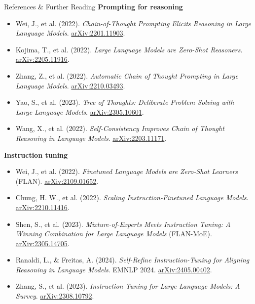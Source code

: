 \begin{frame}[allowframebreaks]{References \& Further Reading}
  \small
  \textbf{Prompting for reasoning}
  \begin{itemize}\itemsep0.3em
    \item Wei, J., et al. (2022). \emph{Chain-of-Thought Prompting Elicits Reasoning in Large Language Models}. \href{https://arxiv.org/abs/2201.11903}{arXiv:2201.11903}.
    \item Kojima, T., et al. (2022). \emph{Large Language Models are Zero-Shot Reasoners}. \href{https://arxiv.org/abs/2205.11916}{arXiv:2205.11916}.
    \item Zhang, Z., et al. (2022). \emph{Automatic Chain of Thought Prompting in Large Language Models}. \href{https://arxiv.org/abs/2210.03493}{arXiv:2210.03493}.
    \item Yao, S., et al. (2023). \emph{Tree of Thoughts: Deliberate Problem Solving with Large Language Models}. \href{https://arxiv.org/abs/2305.10601}{arXiv:2305.10601}.
    \item Wang, X., et al. (2022). \emph{Self-Consistency Improves Chain of Thought Reasoning in Language Models}. \href{https://arxiv.org/abs/2203.11171}{arXiv:2203.11171}.
  \end{itemize}
  \vspace{0.4em}
  \textbf{Instruction tuning}
  \begin{itemize}\itemsep0.3em
    \item Wei, J., et al. (2022). \emph{Finetuned Language Models are Zero-Shot Learners} (FLAN). \href{https://arxiv.org/abs/2109.01652}{arXiv:2109.01652}.
    \item Chung, H. W., et al. (2022). \emph{Scaling Instruction-Finetuned Language Models}. \href{https://arxiv.org/abs/2210.11416}{arXiv:2210.11416}.
    \item Shen, S., et al. (2023). \emph{Mixture-of-Experts Meets Instruction Tuning: A Winning Combination for Large Language Models} (FLAN-MoE). \href{https://arxiv.org/abs/2305.14705}{arXiv:2305.14705}.
    \item Ranaldi, L., \& Freitas, A. (2024). \emph{Self-Refine Instruction-Tuning for Aligning Reasoning in Language Models}. EMNLP 2024. \href{https://arxiv.org/abs/2405.00402}{arXiv:2405.00402}.
    \item Zhang, S., et al. (2023). \emph{Instruction Tuning for Large Language Models: A Survey}. \href{https://arxiv.org/abs/2308.10792}{arXiv:2308.10792}.
  \end{itemize}
  \framebreak

\end{frame}
